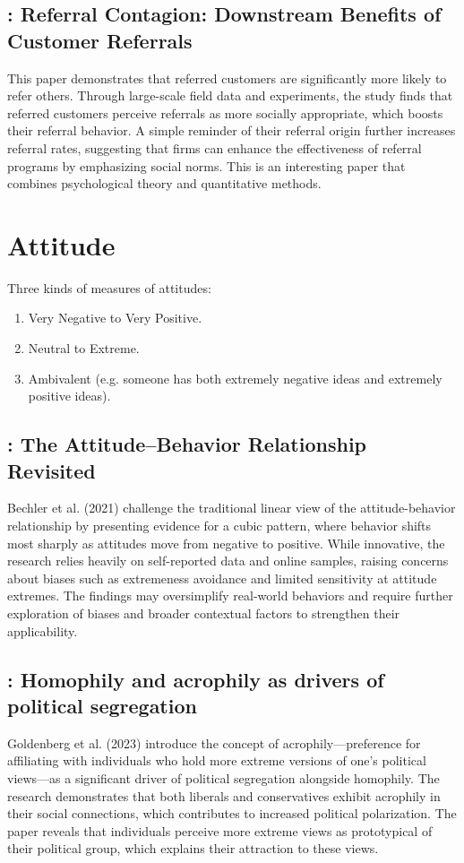 \documentclass[11pt]{elegantbook}
\begin{document}
\section{\cite{gershon2024referral}: Referral Contagion: Downstream Benefits of Customer Referrals}
This paper demonstrates that referred customers are significantly more likely to refer others. Through large-scale field data and experiments, the study finds that referred customers perceive referrals as more socially appropriate, which boosts their referral behavior. A simple reminder of their referral origin further increases referral rates, suggesting that firms can enhance the effectiveness of referral programs by emphasizing social norms. This is an interesting paper that combines psychological theory and quantitative methods.


\chapter{Attitude}
Three kinds of measures of attitudes:
\begin{enumerate}
    \item Very Negative to Very Positive.
    \item Neutral to Extreme.
    \item Ambivalent (e.g. someone has both extremely negative ideas and extremely positive ideas).
\end{enumerate}

\section{\cite{bechler2021attitude}: The Attitude–Behavior Relationship  Revisited}
Bechler et al. (2021) challenge the traditional linear view of the attitude-behavior relationship by presenting evidence for a cubic pattern, where behavior shifts most sharply as attitudes move from negative to positive. While innovative, the research relies heavily on self-reported data and online samples, raising concerns about biases such as extremeness avoidance and limited sensitivity at attitude extremes. The findings may oversimplify real-world behaviors and require further exploration of biases and broader contextual factors to strengthen their applicability.

\section{\cite{goldenberg2023homophily}: Homophily and acrophily as drivers of political segregation}
Goldenberg et al. (2023) introduce the concept of acrophily—preference for affiliating with individuals who hold more extreme versions of one’s political views—as a significant driver of political segregation alongside homophily. The research demonstrates that both liberals and conservatives exhibit acrophily in their social connections, which contributes to increased political polarization. The paper reveals that individuals perceive more extreme views as prototypical of their political group, which explains their attraction to these views.
\end{document}
